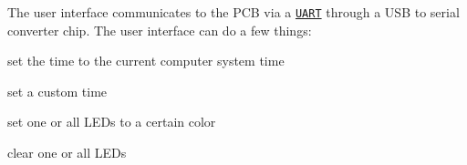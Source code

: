 The user interface communicates to the P\+CB via a \href{https://en.wikipedia.org/wiki/Universal_asynchronous_receiver/transmitter}{\tt U\+A\+RT} through a U\+SB to serial converter chip. The user interface can do a few things\+:
\begin{DoxyItemize}
\item set the time to the current computer system time
\item set a custom time
\item set one or all L\+E\+Ds to a certain color
\item clear one or all L\+E\+Ds
\end{DoxyItemize}

 